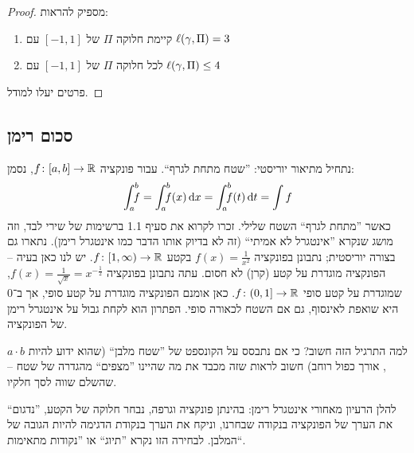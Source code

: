 \documentclass[]{../../../../tex/classes/styledArticle}
\begin{document}
	\begin{proof}
		מספיק להראות:
		\begin{enumerate}
			\item קיימת חלוקה $\Pi$ של $[-1, 1]$ עם $\ell(\gamma, \Pi) = 3$
			\item לכל חלוקה $\Pi$ של $[-1, 1]$ עם $\ell(\gamma, \Pi) \le 4$
		\end{enumerate}
		פרטים יעלו למודל. 
	\end{proof}
	
	\subsection*{סכום רימן}
	נתחיל מתיאור יוריסטי: ''שטח מתחת לגרף``. עבור פונקציה $f \colon [a, b] \to \mathbb{R}$, נסמן: 
	\[ \int^{b}_a \dequad \ f = \int^{b}_a \dequad\ f(x)\dx = \int^{b}_a \dequad \ f(t) \dt = \int f \]
	כאשר ''מתחת לגרף`` השטח שלילי. זכרו לקרוא את סעיף 1.1 ברשימות של שירי לבד, וזה מושג שנקרא ''אינטגרל לא אמיתי`` (זה לא בדיוק אותו הדבר כמו אינטגרל רימן). נתארו גם בצורה יוריסטית; נתבונן בפונקציה $f(x) = \frac{1}{x^2}$ בקטע $f \colon [1, \infty) \to \mathbb{R}$. יש לנו כאן בעיה – הפונקציה מוגדרת על קטע (קרן) לא חסום. עתה נתבונן בפונקציה $f(x) = \frac{1}{\sqrt x} = x^{-\frac{1}{2}}$, שמוגדרת על קטע סופי $f \colon (0, 1] \to \mathbb{R}$. כאן אומנם הפונקציה מוגדרת על קטע סופי, אך ב־$0$ היא שואפת לאינסוף, גם אם השטח לכאורה סופי. הפתרון הוא לקחת גבול על אינטגרל רימן של הפונקציה. 
	
	
	למה התרגיל הזה חשוב? כי אם נתבסס על הקונספט של ''שטח מלבן`` (שהוא ידוע להיות $a \cdot b$, אורך כפול רוחב) חשוב לראות שזה מכבד את מה שהיינו ''מצפים`` מהגדרה של שטח – שהשלם שווה לסך חלקיו. 
	
	להלן הרעיון מאחורי אינטגרל רימן: בהינתן פונקציה וגרפה, נבחר חלוקה של הקטע, ''נדגום`` את הערך של הפונקציה בנקודה שבחרנו, וניקח את הערך בנקודת הדגימה להיות הגובה של המלבן. לבחירה הזו נקרא ''תיוג`` או ''נקודות מתאימות``. 
	
		
\end{document}
